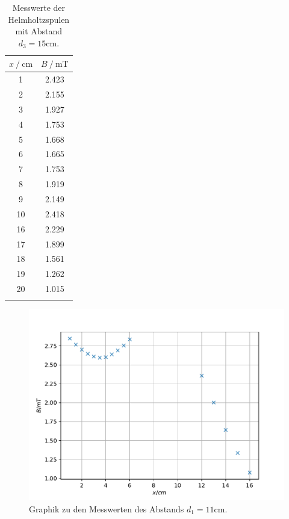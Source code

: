 \begin{table}
\centering
\caption{Messwerte der Helmholtzspulen mit Abstand $d_3=15\si{\centi\metre}$.}
\begin{tabular}{cc}
\toprule
$x \:/\: \si{\centi\metre}$ & $B \:/\: \si{\milli\tesla}$ \\
\midrule
1& 2.423  \\
2& 2.155\\
3& 1.927\\
4& 1.753\\
5& 1.668\\
6& 1.665\\
7& 1.753\\
8& 1.919\\
9& 2.149\\
10& 2.418\\
16& 2.229\\
17& 1.899\\
18& 1.561\\
19& 1.262\\
20& 1.015\\
\bottomrule
\label{tab:helm3}
\end{tabular}
\end{table}

\begin{figure}
\centering
\includegraphics{content/data/plot_helmholtz1.pdf}
\caption{Graphik zu den Messwerten des Abstands $d_1=11\si{\centi\metre}$. }
\label{fig:helm1}
\end{figure}

